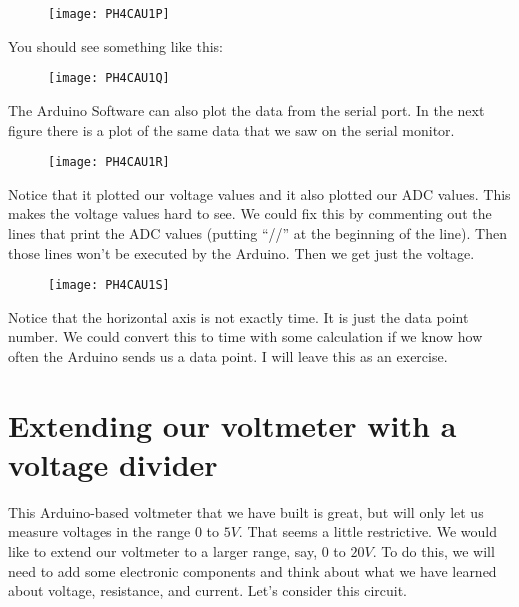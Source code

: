 \begin{figure}[h!]
	\centering
	\texttt{[image: PH4CAU1P]}
\end{figure}

\noindent You should see something like this:

\begin{figure}[h!]
	\centering
	\texttt{[image: PH4CAU1Q]}
\end{figure}

The Arduino Software can also plot the data from the serial port. In the next figure there is a plot of the same data that we saw on the serial monitor. 

\begin{figure}[h!]
	\centering
	\texttt{[image: PH4CAU1R]}
\end{figure}

Notice that it plotted our voltage values and it also plotted our ADC values. This makes the voltage values hard to see. We could fix this by commenting out the lines that print the ADC values (putting ``//'' at the beginning of the line). Then those lines won't be executed by the Arduino. Then we get just the voltage. 

\begin{figure}[h!]
	\centering
    \texttt{[image: PH4CAU1S]}
\end{figure}

Notice that the horizontal axis is not exactly time. It is just the data point number. We could convert this to time with some calculation if we know how often the Arduino sends us a data point. I will leave this as an exercise.

\section{Extending our voltmeter with a voltage divider\label{Voltmeter with Voltage Divider}}



This Arduino-based voltmeter that we have built is great, but will only let us measure voltages in the range $0$ to $5\unit{V}.$ That seems a little restrictive. We would like to extend our voltmeter to a larger range, say, $0 $ to $20\unit{V}.$ To do this, we will need to add some electronic components and think about what we have learned about voltage, resistance, and current. Let's consider this circuit.

